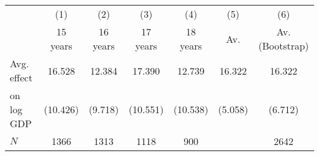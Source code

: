 \begin{tabular}{l*{6}{c}}
\hline\hline
            &\multicolumn{1}{c}{(1)}&\multicolumn{1}{c}{(2)}&\multicolumn{1}{c}{(3)}&\multicolumn{1}{c}{(4)}&\multicolumn{1}{c}{(5)}&\multicolumn{1}{c}{(6)}\\
            &    15 years&    16 years&    17 years&    18 years&         Av.&Av.(Bootstrap)\\
\hline
Avg. effect &      16.528&      12.384&      17.390&      12.739&      16.322&      16.322\\
on log GDP  &    (10.426)&     (9.718)&    (10.551)&    (10.538)&     (5.058)&     (6.712)\\
\hline
\(N\)       &        1366&        1313&        1118&         900&            &        2642\\
\hline\hline
\end{tabular}
